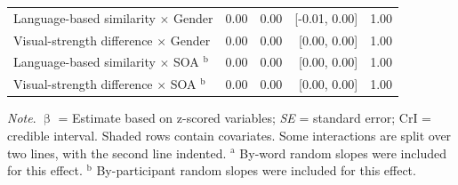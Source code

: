 \documentclass[
  12pt,
  man,floatsintext]{apa7}
\begin{document}
\begin{table}[H]
\begin{threeparttable}
\begin{tabular}[t]{lrrrr}
\hspace{1em}Language-based similarity  $\times$  Gender & 0.00 & 0.00 & {}[-0.01, 0.00] & 1.00\\
\hspace{1em}Visual-strength difference  $\times$  Gender & 0.00 & 0.00 & {}[0.00, 0.00] & 1.00\\
\hspace{1em}Language-based similarity  $\times$  SOA $^{\text{b}}$ & 0.00 & 0.00 & {}[0.00, 0.00] & 1.00\\
\hspace{1em}Visual-strength difference  $\times$  SOA $^{\text{b}}$ & 0.00 & 0.00 & {}[0.00, 0.00] & 1.00\\
\bottomrule
\end{tabular}
\begin{tablenotes}
\item \textit{\linebreak} 
\item \textit{Note}. $\upbeta$ = Estimate based on z-scored variables; \textit{SE} = standard error; \linebreak \phantom{.}CrI = credible interval. Shaded rows contain covariates. Some interactions \linebreak \phantom{.}are split over two lines, with the second line indented. \linebreak \linebreak \phantom{.}$^{\text{a}}$ By-word random slopes were included for this effect. \linebreak \phantom{.}$^{\text{b}}$ By-participant random slopes were included for this effect.
\end{tablenotes}
\end{threeparttable}
\end{table}
\end{document}
